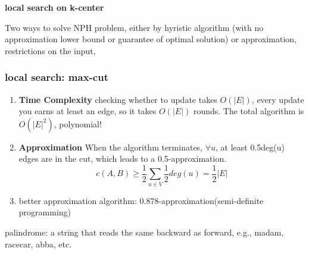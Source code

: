 \textbf{local search on k-center}

Two ways to solve NPH problem, either by hyristic algorithm (with no approximation lower bound or guarantee of optimal solution) or approximation, restrictions on the input,

\subsubsection{local search: max-cut}
\begin{enumerate}
    \item \textbf{Time Complexity} checking whether to update takes $O(|E|)$, every update you earns at least an edge, so it takes $O(|E|)$ rounds. The total algorithm is $O(|E|^2)$, polynomial!
    \item \textbf{Approximation} When the algorithm terminates, $\forall u$, at least 0.5deg(u) edges are in the cut, which leads to a 0.5-approximation.
     \[c(A,B)\geq \frac{1}{2}\sum_{u\in V}\frac{1}{2}deg(u)=\frac{1}{2}|E|\]
    \item better approximation algorithm: 0.878-approximation(semi-definite programming)
\end{enumerate}

palindrome: a string that reads the same backward as forward, e.g., madam, racecar, abba, etc.

